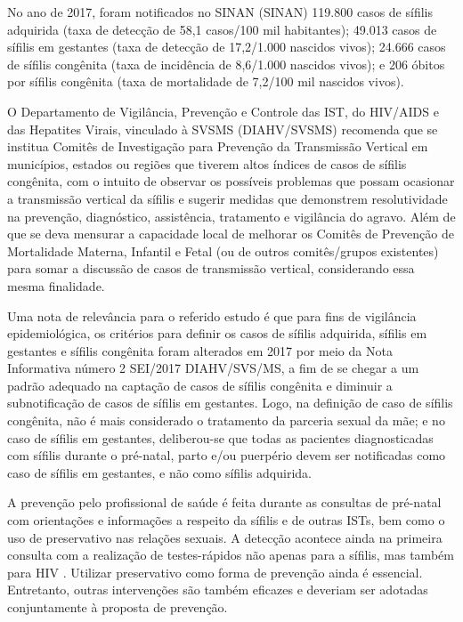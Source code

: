 No ano de 2017, foram notificados no \acrlong{SINAN} (\acrshort{SINAN}) 119.800 casos de sífilis adquirida (taxa de detecção de 58,1 casos/100 mil habitantes); 49.013 casos de sífilis em gestantes (taxa de detecção de 17,2/1.000 nascidos vivos); 24.666 casos de sífilis congênita (taxa de incidência de 8,6/1.000 nascidos vivos); e 206 óbitos por sífilis congênita (taxa de mortalidade de 7,2/100 mil nascidos vivos). \cite{boletim2018}

O Departamento de Vigilância, Prevenção e Controle das \acrshort{IST}, do HIV/AIDS e das Hepatites Virais, vinculado à \acrlong{SVSMS} (DIAHV/\acrshort{SVSMS}) recomenda que se institua Comitês de Investigação para Prevenção da Transmissão Vertical em municípios, estados ou regiões que tiverem altos índices de casos de sífilis congênita, com o intuito de observar os possíveis problemas que possam ocasionar a transmissão vertical da sífilis e sugerir medidas que demonstrem resolutividade na prevenção, diagnóstico, assistência, tratamento e vigilância do agravo. Além de que se deva mensurar a capacidade local de melhorar os Comitês de Prevenção de Mortalidade Materna, Infantil e Fetal (ou de outros comitês/grupos existentes) para somar a discussão de casos de transmissão vertical, considerando essa mesma finalidade. \cite{boletim2018}

Uma nota de relevância para o referido estudo é que para fins de vigilância epidemiológica, os critérios para definir os casos de sífilis adquirida, sífilis em gestantes e sífilis congênita foram alterados em 2017 por meio da Nota Informativa número 2 SEI/2017  DIAHV/SVS/MS, a fim de se chegar a um padrão adequado na captação de casos de sífilis congênita e diminuir a subnotificação de casos de sífilis em gestantes. Logo, na definição de caso de sífilis congênita, não é mais considerado o tratamento da parceria sexual da mãe; e no caso de sífilis em gestantes, deliberou-se que todas as pacientes diagnosticadas com sífilis durante o pré-natal, parto e/ou puerpério devem ser notificadas como caso de sífilis em gestantes, e não como sífilis adquirida. \cite{boletim2018}

A prevenção pelo profissional de saúde é feita durante as consultas de pré-natal com orientações e informações a respeito da sífilis e de outras ISTs, bem como o uso de preservativo nas relações sexuais. A detecção acontece ainda na primeira consulta com a realização de testes-rápidos não apenas para a sífilis, mas também para HIV \cite{brasilprenatal}. Utilizar preservativo como forma de prevenção ainda é essencial. Entretanto, outras intervenções são também eficazes e deveriam ser adotadas conjuntamente à proposta de prevenção. \cite{brasil2015protocolo}

